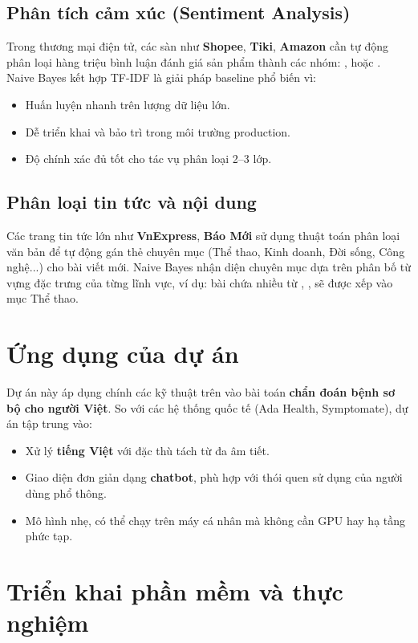 \documentclass[12pt,a4paper]{report}
\begin{document}
\subsection{Phân tích cảm xúc (Sentiment Analysis)}
Trong thương mại điện tử, các sàn như \textbf{Shopee}, \textbf{Tiki}, \textbf{Amazon} cần tự động phân loại hàng triệu bình luận đánh giá sản phẩm thành các nhóm: ,  hoặc . Naive Bayes kết hợp TF-IDF là giải pháp baseline phổ biến vì:
\begin{itemize}
    \item Huấn luyện nhanh trên lượng dữ liệu lớn.
    \item Dễ triển khai và bảo trì trong môi trường production.
    \item Độ chính xác đủ tốt cho tác vụ phân loại 2--3 lớp.
\end{itemize}

\subsection{Phân loại tin tức và nội dung}
Các trang tin tức lớn như \textbf{VnExpress}, \textbf{Báo Mới} sử dụng thuật toán phân loại văn bản để tự động gán thẻ chuyên mục (Thể thao, Kinh doanh, Đời sống, Công nghệ...) cho bài viết mới. Naive Bayes nhận diện chuyên mục dựa trên phân bố từ vựng đặc trưng của từng lĩnh vực, ví dụ: bài chứa nhiều từ , ,  sẽ được xếp vào mục Thể thao.

\section{Ứng dụng của dự án}
Dự án này áp dụng chính các kỹ thuật trên vào bài toán \textbf{chẩn đoán bệnh sơ bộ cho người Việt}. So với các hệ thống quốc tế (Ada Health, Symptomate), dự án tập trung vào:
\begin{itemize}
    \item Xử lý \textbf{tiếng Việt} với đặc thù tách từ đa âm tiết.
    \item Giao diện đơn giản dạng \textbf{chatbot}, phù hợp với thói quen sử dụng của người dùng phổ thông.
    \item Mô hình nhẹ, có thể chạy trên máy cá nhân mà không cần GPU hay hạ tầng phức tạp.
\end{itemize}

\section{Triển khai phần mềm và thực nghiệm}
\end{document}
